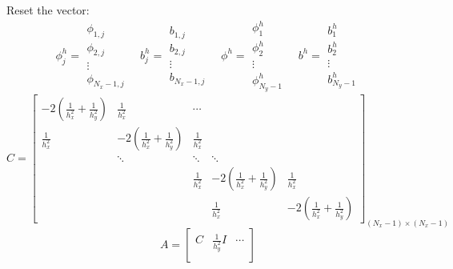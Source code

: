 \documentclass[a4paper,11pt]{article}
\begin{document}
\begin{enumerate}
\begin{enumerate}
    Reset the vector:
    \begin{equation}
      \phi_{j}^{h}=
        \begin{array}{|c|}
          \phi_{1,j}\\
          \phi_{2,j}\\
          \vdots\\
          \phi_{N_x-1,j}
        \end{array}
      \quad
      b_{j}^{h}=
        \begin{array}{|c|}
          b_{1,j}\\
          b_{2,j}\\
          \vdots\\
          b_{N_x-1,j}
        \end{array}
      \quad
      \phi^{h}=
        \begin{array}{|c|}
          \phi^{h}_{1}\\
          \phi^{h}_{2}\\
          \vdots\\
          \phi^{h}_{N_y-1}
        \end{array}
      \quad
      b^{h}=
        \begin{array}{|c|}
          b^{h}_{1}\\
          b^{h}_{2}\\
          \vdots\\
          b^{h}_{N_y-1}
        \end{array}
      \nonumber
    \end{equation}
    \begin{equation}    
      C=
          \begin{bmatrix}
            -2(\frac{1}{h_x^2}+\frac{1}{h_y^2})&\frac{1}{h_x^2}&\cdots \\
            \frac{1}{h_x^2} & -2(\frac{1}{h_x^2}+\frac{1}{h_y^2}) & \frac{1}{h_x^2} \\
            &\ddots & \ddots & \ddots \\
            &  & \frac{1}{h_x^2}&-2(\frac{1}{h_x^2}+\frac{1}{h_y^2}) & \frac{1}{h_x^2} \\
            &  &  & \frac{1}{h_x^2}&-2(\frac{1}{h_x^2}+\frac{1}{h_y^2})
          \end{bmatrix}_{(N_x-1)\times (N_x-1)}
    \end{equation}
    \begin{equation}
      A=
          \begin{bmatrix}
              C & \frac{1}{h_y^2}I & \cdots \\

\end{bmatrix}
\end{equation}
\end{enumerate}
\end{enumerate}
\end{document}
